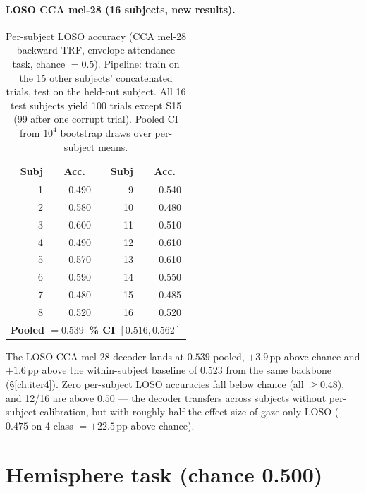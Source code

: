\paragraph{LOSO CCA mel-28 (16 subjects, new results).}

\begin{table}[ht]
\centering
\begin{tabular}{rr|rr}
\toprule
Subj & Acc.\ & Subj & Acc.\ \\
\midrule
1 & 0.490 &  9 & 0.540 \\
2 & 0.580 & 10 & 0.480 \\
3 & 0.600 & 11 & 0.510 \\
4 & 0.490 & 12 & 0.610 \\
5 & 0.570 & 13 & 0.610 \\
6 & 0.590 & 14 & 0.550 \\
7 & 0.480 & 15 & 0.485 \\
8 & 0.520 & 16 & 0.520 \\
\midrule
\multicolumn{4}{l}{\textbf{Pooled $= 0.539$ \quad 95\,\% CI $[0.516, 0.562]$}} \\
\bottomrule
\end{tabular}
\caption{Per-subject LOSO accuracy (CCA mel-28 backward TRF, envelope
attendance task, chance $= 0.5$). Pipeline: train on the 15 other
subjects' concatenated trials, test on the held-out subject. All 16
test subjects yield 100 trials except S15 (99 after one corrupt
trial). Pooled CI from $10^4$ bootstrap draws over per-subject means.}
\end{table}

The LOSO CCA mel-28 decoder lands at $0.539$ pooled, $+3.9$\,pp above
chance and $+1.6$\,pp above the within-subject baseline of $0.523$
from the same backbone (§\ref{ch:iter4}). Zero per-subject LOSO
accuracies fall below chance (all $\geq 0.48$), and 12/16 are above
$0.50$ --- the decoder transfers across subjects without per-subject
calibration, but with roughly half the effect size of gaze-only
LOSO ($0.475$ on 4-class $= +22.5$\,pp above chance).

\section{Hemisphere task (chance 0.500)}

